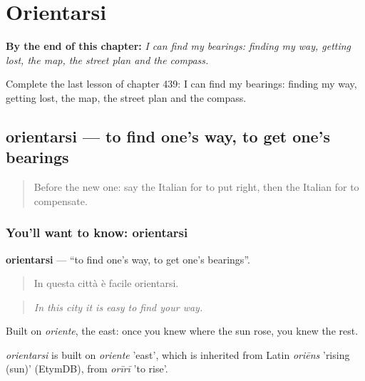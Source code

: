 
\chapter{Orientarsi}
\label{ch:it-orientarsi}

\begin{chapteropening}
\textbf{By the end of this chapter:} \emph{I can find my bearings: finding my way, getting lost, the map, the street plan and the compass.}

Complete the last lesson of chapter 439: I can find my bearings: finding my way, getting lost, the map, the street plan and the compass.
\end{chapteropening}

\section[orientarsi]{orientarsi — to find one's way, to get one's bearings}

\label{lesson:IT-C439-orientarsi}



\begin{quote}
Before the new one: say the Italian for to put right, then the Italian for to compensate.
\end{quote}

\subsection*{You'll want to know: orientarsi}
\textbf{orientarsi} — \textquotedblleft{}to find one's way, to get one's bearings\textquotedblright{}.

\begin{quote}
In questa città è facile orientarsi.
\end{quote}

\begin{quote}
\emph{In this city it is easy to find your way.}
\end{quote}

Built on \emph{oriente}, the east: once you knew where the sun rose, you knew the rest.

\begin{cousinweb}
\emph{orientarsi} is built on \emph{oriente} 'east', which is inherited from Latin \emph{oriēns} 'rising (sun)' (EtymDB), from \emph{orīrī} 'to rise'.
\end{cousinweb}

